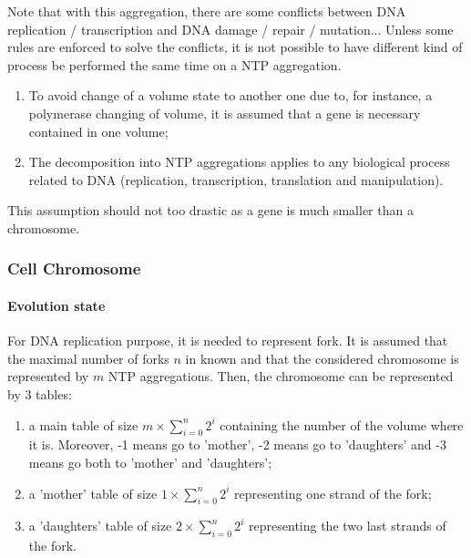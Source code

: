 Note that with this aggregation, there are some conflicts between DNA replication / transcription and DNA damage / repair / mutation... Unless some rules are enforced to solve the conflicts, it is not possible to have different kind of process be performed the same time on a NTP aggregation.
\begin{assum}
\begin{enumerate}
  \item To avoid change of a volume state to another one due to, for instance, a polymerase changing of volume, it is assumed that a gene is necessary contained in one volume;
  \item The decomposition into NTP aggregations applies to any biological process related to DNA (replication, transcription, translation and manipulation).
\end{enumerate}
\end{assum}
\noindent This assumption should not too drastic as a gene is much smaller than a chromosome.


\subsubsection{Cell Chromosome}
\paragraph{Evolution state} For DNA replication purpose, it is needed to represent fork. It is assumed that the maximal number of forks $n$ in known and that the considered chromosome is represented by $m$ NTP aggregations. Then, the chromosome can be represented by 3 tables:
\begin{enumerate}
  \item a main table of size $m \times \sum_{i=0}^n2^i$ containing the number of the volume where it is. Moreover, -1 means go to 'mother', -2 means go to 'daughters' and -3 means go both to 'mother' and 'daughters';
  \item a 'mother' table of size $1 \times \sum_{i=0}^n2^i$ representing one strand of the fork;
  \item a 'daughters' table of size $2 \times \sum_{i=0}^n2^i$ representing the two last strands of the fork.
\end{enumerate}

\medskip

